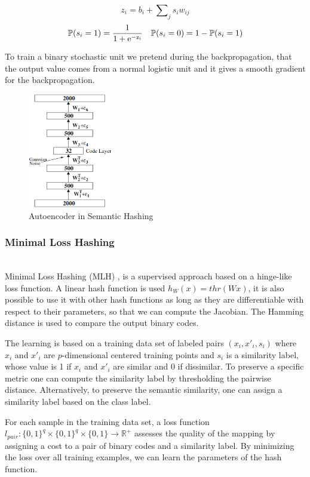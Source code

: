 \[z_i=b_i+\sum\nolimits_{j}s_{i}w_{ij}\]
\begin{align*}
\mathbb{P}(s_i=1)=\frac{1}{1+\rm{e}^{-z_i}} && \mathbb{P}(s_i=0)=1-\mathbb{P}(s_i=1)
\end{align*}

To train a binary stochastic unit we pretend during the backpropagation, that the output value comes from a normal logistic unit and it gives a smooth gradient for the backpropagation.

\begin{figure}
	\includegraphics[height=5cm]{auto_encoder.png}
	\caption{Autoencoder in Semantic Hashing}
	\label{fig:auto_encoder}
\end{figure}

\subsubsection{Minimal Loss Hashing}
~\\
Minimal Loss Hashing (MLH) \cite{norouzi2011minimal},\cite{norouzi2016} is a supervised approach based on a hinge-like loss function. A linear hash function is used $h_W(x)=thr(Wx)$, it is also possible to use it with other hash functions as long as they are differentiable with respect to their parameters, so that we can compute the Jacobian. The Hamming distance is used to compare the output binary codes.

The learning is based on a training data set of labeled pairs $(x_i, x'_i, s_i)$ where $x_i$ and $x'_i$ are $p$-dimensional centered training points and $s_i$ is a similarity label, whose value is 1 if $x_i$ and $x'_i$ are similar and 0 if dissimilar. To preserve a specific metric one can compute the similarity label by thresholding the pairwise distance. Alternatively, to preserve the semantic similarity, one can assign a similarity label based on the class label.

For each sample in the training data set, a loss function $l_{pair}: \{0, 1\}^{q}\times\{0, 1\}^{q}\times\{0, 1\}\rightarrow\mathbb{R}^{+}$ assesses the quality of the mapping by assigning a cost to a pair of binary codes and a similarity label. By minimizing the loss over all training examples, we can learn the parameters of the hash function.

